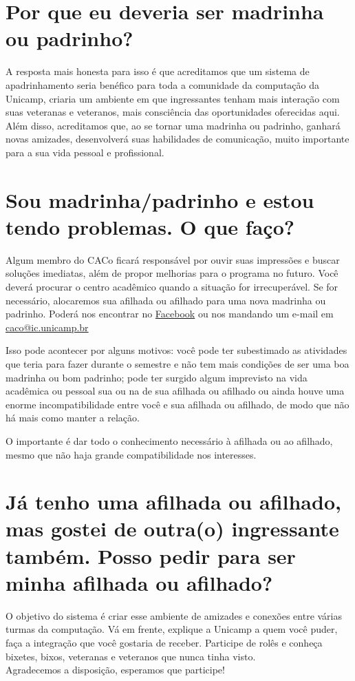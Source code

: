 \documentclass[10pt]{article}
\begin{document}
\section*{Por que eu deveria ser madrinha ou padrinho?}

A resposta mais honesta para isso é que acreditamos que um sistema de
apadrinhamento seria benéfico para toda a comunidade da computação da Unicamp,
criaria um ambiente em que ingressantes tenham mais interação com suas
veteranas e veteranos, mais consciência das oportunidades oferecidas aqui. Além
disso, acreditamos que, ao se tornar uma madrinha ou padrinho, ganhará novas
amizades, desenvolverá suas habilidades de comunicação, muito importante para
a sua vida pessoal e profissional.

\section*{Sou madrinha/padrinho e estou tendo problemas. O que faço?}

Algum membro do CACo ficará responsável por ouvir suas impressões e buscar
soluções imediatas, além de propor melhorias para o programa no futuro. Você
deverá procurar o centro acadêmico quando a situação for irrecuperável. Se for
necessário, alocaremos sua afilhada ou afilhado para uma nova madrinha ou
padrinho. Poderá nos encontrar no
\href{https://www.facebook.com/cacounicamp/}{Facebook} ou nos mandando um
e-mail em \href{mailto:caco@ic.unicamp.br}{caco@ic.unicamp.br}

Isso pode acontecer por alguns motivos: você pode ter subestimado as atividades
que teria para fazer durante o semestre e não tem mais condições de ser uma boa
madrinha ou bom padrinho; pode ter surgido algum imprevisto na vida acadêmica
ou pessoal sua ou na de sua afilhada ou afilhado ou ainda houve uma enorme
incompatibilidade entre você e sua afilhada ou afilhado, de modo que não há
mais como manter a relação.

O importante é dar todo o conhecimento necessário à afilhada ou ao afilhado,
mesmo que não haja grande compatibilidade nos interesses.

\section*{Já tenho uma afilhada ou afilhado, mas gostei de outra(o) ingressante
também. Posso pedir para ser minha afilhada ou afilhado?}

O objetivo do sistema é criar esse ambiente de amizades e conexões entre várias
turmas da computação. Vá em frente, explique a Unicamp a quem você puder, faça
a integração que você gostaria de receber. Participe de rolês e conheça
bixetes, bixos, veteranas e veteranos que nunca tinha visto.\\

Agradecemos a disposição, esperamos que participe!
\end{document}
